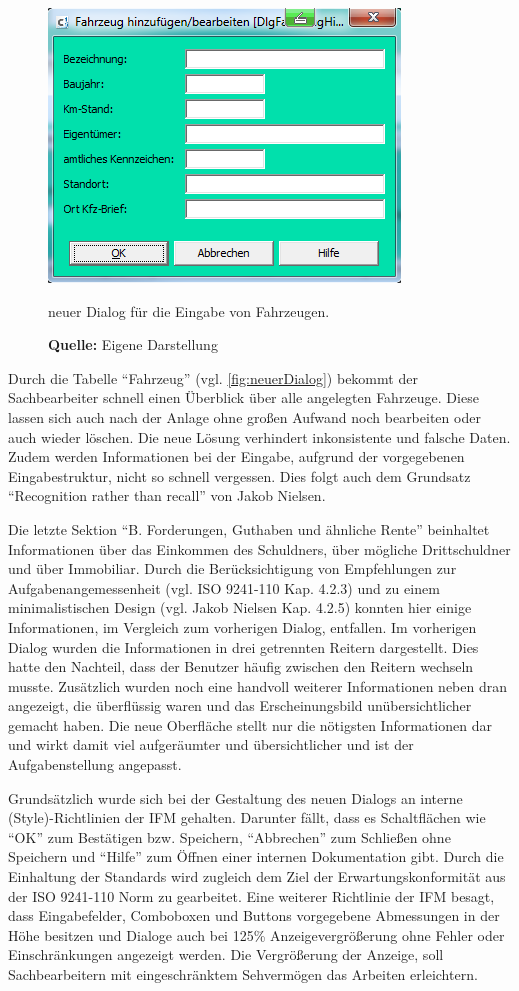 \begin{figure}[H]
  \centering
  \includegraphics[scale=0.9]{img/FahrzeugAnlegenBearbeiten_Dialog.PNG}
  \caption{neuer Dialog für die Eingabe von Fahrzeugen.}
    \caption*{\textbf{Quelle:} Eigene Darstellung}
  \label{fig:fahrzeugAnlegenBearbeitenDialog}
\end{figure}
Durch die Tabelle \enquote{Fahrzeug} (vgl. \ref{fig:neuerDialog}) bekommt der Sachbearbeiter schnell einen Überblick über alle angelegten Fahrzeuge. Diese lassen sich auch nach der Anlage ohne großen Aufwand noch bearbeiten oder auch wieder löschen. Die neue Lösung verhindert inkonsistente und falsche Daten. Zudem werden Informationen bei der Eingabe, aufgrund der vorgegebenen Eingabestruktur, nicht so schnell vergessen. Dies folgt auch dem Grundsatz \enquote{Recognition rather than recall} von Jakob Nielsen.

Die letzte Sektion \enquote{B. Forderungen, Guthaben und ähnliche Rente} beinhaltet Informationen über das Einkommen des Schuldners, über mögliche Drittschuldner und über Immobiliar. Durch die Berücksichtigung von Empfehlungen zur Aufgabenangemessenheit (vgl. ISO 9241-110 Kap. 4.2.3) und zu einem minimalistischen Design (vgl. Jakob Nielsen Kap. 4.2.5) konnten hier einige Informationen, im Vergleich zum vorherigen Dialog, entfallen. Im vorherigen Dialog wurden die Informationen in drei getrennten Reitern dargestellt. Dies hatte den Nachteil, dass der Benutzer häufig zwischen den Reitern wechseln musste. Zusätzlich wurden noch eine handvoll weiterer Informationen neben dran angezeigt, die überflüssig waren und das Erscheinungsbild unübersichtlicher gemacht haben. Die neue Oberfläche stellt nur die nötigsten Informationen dar und wirkt damit viel aufgeräumter und übersichtlicher und ist der Aufgabenstellung angepasst.

Grundsätzlich wurde sich bei der Gestaltung des neuen Dialogs an interne (Style)-Richtlinien der IFM gehalten. Darunter fällt, dass es Schaltflächen wie \enquote{OK} zum Bestätigen bzw. Speichern, \enquote{Abbrechen} zum Schließen ohne Speichern und \enquote{Hilfe} zum Öffnen einer internen Dokumentation gibt. Durch die Einhaltung der Standards wird zugleich dem Ziel der Erwartungskonformität aus der ISO 9241-110 Norm  zu gearbeitet. Eine weiterer Richtlinie der IFM besagt, dass Eingabefelder, Comboboxen und Buttons vorgegebene Abmessungen in der Höhe besitzen und Dialoge auch bei 125\% Anzeigevergrößerung ohne Fehler oder Einschränkungen angezeigt werden. Die Vergrößerung der Anzeige, soll Sachbearbeitern mit eingeschränktem Sehvermögen das Arbeiten erleichtern.


